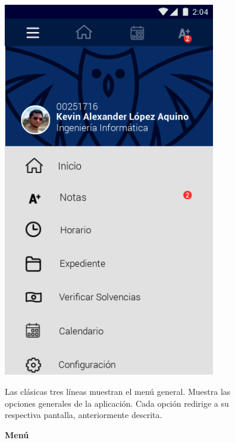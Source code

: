 \documentclass[12pt]{article}
\begin{document}
\begin{figure}[t]
	\begin{minipage}[t]{0.45\textwidth}
		\centering
		\caption{\textbf{Menú}}
		\includegraphics[width=0.825\textwidth]{img/5.png}
	\end{minipage}\hfill
	\begin{minipage}[t]{0.45\textwidth}
		\vspace*{10mm}
		Las clásicas tres líneas muestran el menú general. Muestra las opciones generales de la aplicación. Cada opción redirige a su respectiva pantalla, anteriormente descrita.
	\end{minipage}
\end{figure}
\end{document}
